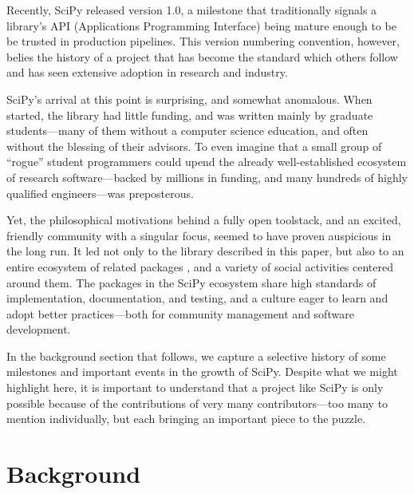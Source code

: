 \documentclass[fleqn,10pt]{wlscirep}
\begin{document}
Recently, SciPy released version 1.0, a milestone that traditionally
signals a library's API (Applications Programming Interface) being
mature enough to be be trusted in production pipelines. This version 
numbering convention, however, belies the history of a project that has
become the standard which others follow and has seen extensive
adoption in research and industry.

SciPy's arrival at this point is surprising, and somewhat anomalous.
When started, the library had little funding, and was written mainly
by graduate students---many of them without a computer science education, and often without the
blessing of their advisors.  To even imagine that a small group of
``rogue'' student programmers could upend the already well-established
ecosystem of research software---backed by millions in funding, and
many hundreds of highly qualified engineers\cite{mathworks-globe-97,
esri-revenue,bloom-wolfram}---was preposterous.

Yet, the philosophical motivations behind a fully open toolstack, and
an excited, friendly community with a singular focus, seemed to have
proven auspicious in the long run.  It led not only to the library
described in this paper, but also to an entire ecosystem of related
packages \cite{scipy-ecosystem}, and a variety of social activities centered around
them\cite{social-python}. The packages in the SciPy ecosystem 
share high standards of implementation,
documentation, and testing, and a culture eager to learn and adopt
better practices---both for community management and software
development.


In the background section that follows, we capture a selective history
of some milestones and important events in the growth of SciPy.
Despite what we might highlight here, it is important to understand
that a project like SciPy is only possible because of the
contributions of very many contributors---too many to mention
individually, but each bringing an important piece to the puzzle.

\section*{Background}
\end{document}
